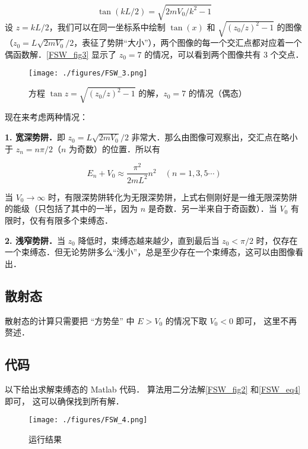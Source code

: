 \begin{equation}
\tan(k L/2)=\sqrt{2mV_0/k^2-1}
\end{equation}
设 $z=k L/2$，我们可以在同一坐标系中绘制 $\tan(x)$ 和 $\sqrt{(z_0/z)^2-1}$ 的图像（$z_0=L\sqrt{2mV_0}/2$，表征了势阱“大小”），两个图像的每一个交汇点都对应着一个偶函数解．\autoref{FSW_fig3} 显示了 $z_0=7$ 的情况，可以看到两个图像共有 $3$ 个交点．

\begin{figure}[ht]
\centering
\texttt{[image: ./figures/FSW\_3.png]}
\caption{方程 $\tan z=\sqrt{(z_0/z)^2-1}$ 的解，$z_0=7$ 的情况（偶态）} \label{FSW_fig3}
\end{figure}

现在来考虑两种情况：

\textbf{1. 宽深势阱．}即 $z_0=L\sqrt{2mV_0}/2$ 非常大．那么由图像可观察出，交汇点在略小于 $z_n=n\pi/2$（$n$ 为奇数）的位置．所以有

\begin{equation}
E_n+V_0\approx \frac{\pi^2}{2mL^2}n^2\quad (n=1,3,5\cdots)
\end{equation}

当 $V_0\rightarrow \infty$ 时，有限深势阱转化为无限深势阱，上式右侧刚好是一维无限深势阱的能级（只包括了其中的一半，因为 $n$ 是奇数．另一半来自于奇函数）．当 $V_0$ 有限时，仅有有限多个束缚态．

\textbf{2. 浅窄势阱．}当 $z_0$ 降低时，束缚态越来越少，直到最后当 $z_0<\pi/2$ 时，仅存在一个束缚态．但无论势阱多么“浅小”，总是至少存在一个束缚态，这可以由图像看出．

\subsection{散射态}

散射态的计算只需要把 “方势垒” 中 $E > V_0$ 的情况下取 $V_0 < 0$ 即可， 这里不再赘述．

\subsection{代码}
以下给出求解束缚态的 Matlab 代码． 算法用二分法解\autoref{FSW_fig2} 和\autoref{FSW_eq4} 即可， 这可以确保找到所有解．

\begin{figure}[ht]
\centering
\texttt{[image: ./figures/FSW\_4.png]}
\caption{运行结果} \label{FSW_fig4}
\end{figure}

